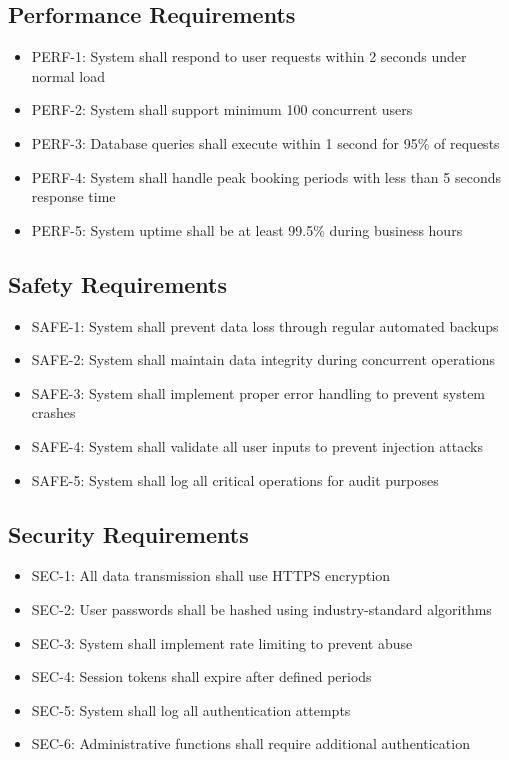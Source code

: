 \documentclass[12pt,a4paper]{article}
\begin{document}
\subsection{Performance Requirements}
\begin{itemize}
    \item PERF-1: System shall respond to user requests within 2 seconds under normal load
    \item PERF-2: System shall support minimum 100 concurrent users
    \item PERF-3: Database queries shall execute within 1 second for 95\% of requests
    \item PERF-4: System shall handle peak booking periods with less than 5 seconds response time
    \item PERF-5: System uptime shall be at least 99.5\% during business hours
\end{itemize}

\subsection{Safety Requirements}
\begin{itemize}
    \item SAFE-1: System shall prevent data loss through regular automated backups
    \item SAFE-2: System shall maintain data integrity during concurrent operations
    \item SAFE-3: System shall implement proper error handling to prevent system crashes
    \item SAFE-4: System shall validate all user inputs to prevent injection attacks
    \item SAFE-5: System shall log all critical operations for audit purposes
\end{itemize}

\subsection{Security Requirements}
\begin{itemize}
    \item SEC-1: All data transmission shall use HTTPS encryption
    \item SEC-2: User passwords shall be hashed using industry-standard algorithms
    \item SEC-3: System shall implement rate limiting to prevent abuse
    \item SEC-4: Session tokens shall expire after defined periods
    \item SEC-5: System shall log all authentication attempts
    \item SEC-6: Administrative functions shall require additional authentication
\end{itemize}
\end{document}
